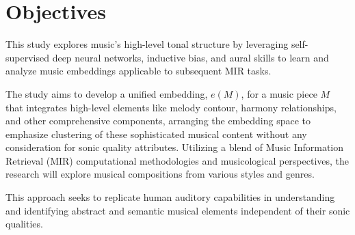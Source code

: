 \section{Objectives}

This study explores music's high-level tonal structure by leveraging self-supervised deep neural networks, inductive bias, and aural skills to learn and analyze music embeddings applicable to subsequent MIR tasks. 

The study aims to develop a unified embedding, $e(M)$, for a music piece $M$ that integrates high-level elements like melody contour, harmony relationships, and other comprehensive components, arranging the embedding space to emphasize clustering of these sophisticated musical content without any consideration for sonic quality attributes. Utilizing a blend of Music Information Retrieval (MIR) computational methodologies and musicological perspectives, the research will explore musical compositions from various styles and genres. 

This approach seeks to replicate human auditory capabilities in understanding and identifying abstract and semantic musical elements independent of their sonic qualities.